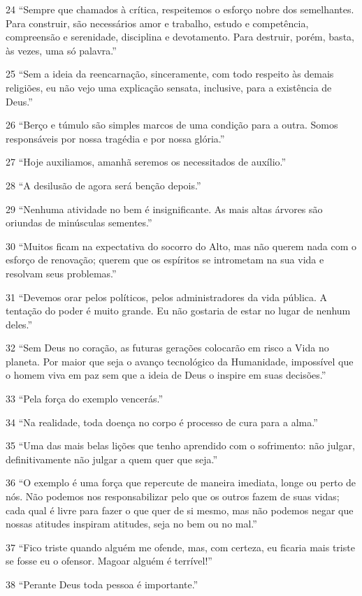 24 ``Sempre que chamados à crítica, respeitemos o esforço nobre dos semelhantes. Para construir, são necessários amor e trabalho, estudo e competência, compreensão e serenidade, disciplina e devotamento. Para destruir, porém, basta, às vezes, uma só palavra.”

25 ``Sem a ideia da reencarnação, sinceramente, com todo respeito às demais religiões, eu não vejo uma explicação sensata, inclusive, para a existência de Deus.”

26 ``Berço e túmulo são simples marcos de uma condição para a outra. Somos responsáveis por nossa tragédia e por nossa glória.”

27 ``Hoje auxiliamos, amanhã seremos os necessitados de auxílio.”

28 ``A desilusão de agora será benção depois.”

29 ``Nenhuma atividade no bem é insignificante. As mais altas árvores são oriundas de minúsculas sementes.”

30 ``Muitos ficam na expectativa do socorro do Alto, mas não querem nada com o esforço de renovação; querem que os espíritos se intrometam na sua vida e resolvam seus problemas.”

31 ``Devemos orar pelos políticos, pelos administradores da vida pública. A tentação do poder é muito grande. Eu não gostaria de estar no lugar de nenhum deles.”

32 ``Sem Deus no coração, as futuras gerações colocarão em risco a Vida no planeta. Por maior que seja o avanço tecnológico da Humanidade, impossível que o homem viva em paz sem que a ideia de Deus o inspire em suas decisões.”

33 ``Pela força do exemplo vencerás.”

34 ``Na realidade, toda doença no corpo é processo de cura para a alma.”

35 ``Uma das mais belas lições que tenho aprendido com o sofrimento: não julgar, definitivamente não julgar a quem quer que seja.”

36 ``O exemplo é uma força que repercute de maneira imediata, longe ou perto de nós. Não podemos nos responsabilizar pelo que os outros fazem de suas vidas; cada qual é livre para fazer o que quer de si mesmo, mas não podemos negar que nossas atitudes inspiram atitudes, seja no bem ou no mal.”

37 ``Fico triste quando alguém me ofende, mas, com certeza, eu ficaria mais triste se fosse eu o ofensor. Magoar alguém é terrível!”

38 ``Perante Deus toda pessoa é importante.”

